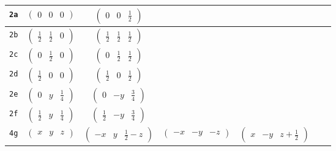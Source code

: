 \documentclass[fleqn,9pt,landscape]{jsarticle}
\begin{document}
\begin{center}
\begin{longtable}{ccccccc}
{\tt 2a} & $ \begin{pmatrix} 0 & 0 & 0 \end{pmatrix} $ & $ \begin{pmatrix} 0 & 0 & \frac{1}{2} \end{pmatrix} $ & $  $ & $  $ \\ \hline
{\tt 2b} & $ \begin{pmatrix} \frac{1}{2} & \frac{1}{2} & 0 \end{pmatrix} $ & $ \begin{pmatrix} \frac{1}{2} & \frac{1}{2} & \frac{1}{2} \end{pmatrix} $ & $  $ & $  $ \\ \hline
{\tt 2c} & $ \begin{pmatrix} 0 & \frac{1}{2} & 0 \end{pmatrix} $ & $ \begin{pmatrix} 0 & \frac{1}{2} & \frac{1}{2} \end{pmatrix} $ & $  $ & $  $ \\ \hline
{\tt 2d} & $ \begin{pmatrix} \frac{1}{2} & 0 & 0 \end{pmatrix} $ & $ \begin{pmatrix} \frac{1}{2} & 0 & \frac{1}{2} \end{pmatrix} $ & $  $ & $  $ \\ \hline
{\tt 2e} & $ \begin{pmatrix} 0 & y & \frac{1}{4} \end{pmatrix} $ & $ \begin{pmatrix} 0 & - y & \frac{3}{4} \end{pmatrix} $ & $  $ & $  $ \\ \hline
{\tt 2f} & $ \begin{pmatrix} \frac{1}{2} & y & \frac{1}{4} \end{pmatrix} $ & $ \begin{pmatrix} \frac{1}{2} & - y & \frac{3}{4} \end{pmatrix} $ & $  $ & $  $ \\ \hline
{\tt 4g} & $ \begin{pmatrix} x & y & z \end{pmatrix} $ & $ \begin{pmatrix} - x & y & \frac{1}{2} - z \end{pmatrix} $ & $ \begin{pmatrix} - x & - y & - z \end{pmatrix} $ & $ \begin{pmatrix} x & - y & z + \frac{1}{2} \end{pmatrix} $ \\
\end{longtable}
\end{center}
\end{document}
